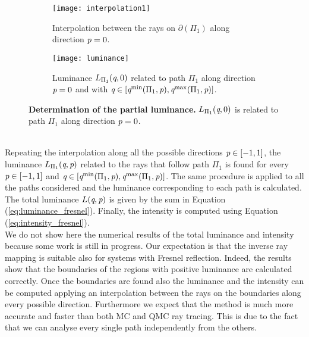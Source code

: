 \begin{figure}[t]
\centering
\begin{subfigure}{.45\textwidth}
  \texttt{[image: interpolation1]}
 \caption{Interpolation between the rays on $\partial$$(\Pi_1)$ along direction $\textit{p}=0$.}
  \label{fig:interpolation1}
\end{subfigure}%
\hfill
\begin{subfigure}{.45\textwidth}
  \texttt{[image: luminance]}
  \caption{Luminance $L_{\Pi_1}(\textit{q}, 0)$ related to path $\Pi_1$ along direction $\textit{p}=0$ and with $\textit{q}\in[\textit{q}^{\textrm{min}}(\Pi_1, \textit{p}), \textit{q}^{\textrm{max}}(\Pi_1, \textit{p})]$.} %
  \label{fig:luminance_fresnel}
\end{subfigure} %
\caption{\textbf{Determination of the partial luminance.} $L_{\Pi_1}(\textit{q}, 0)$ is related to path $\Pi_1$ along direction $\textit{p}=0$.} 
\end{figure}
\\\indent 
Repeating the interpolation along all the possible directions $\textit{p}\in[-1,1]$, the luminance $L_{\Pi_1}(\textit{q}, \textit{p})$ related to the rays that follow path $\Pi_1$ is found for every $\textit{p}\in[-1,1]$ and $\textit{q}\in[\textit{q}^{\textrm{min}}(\Pi_1,\textit{p}), \textit{q}^{\textrm{max}}(\Pi_1,\textit{p})]$. The same procedure is applied to all the paths considered and the luminance corresponding to each path is calculated. The total luminance $L(\textit{q}, \textit{p})$ is given by the sum in Equation (\ref{eq:luminance_fresnel}). Finally, the intensity is computed using Equation (\ref{eq:intensity_fresnel}). \\ \indent
We do not show here the numerical results of the total luminance and intensity because some work is still in progress. Our expectation is that the inverse ray mapping is suitable also for systems with Fresnel reflection. Indeed, the results show that the boundaries of the regions with positive luminance are calculated correctly. Once the boundaries are found also the luminance and the intensity can be computed applying an interpolation between the rays on the boundaries along every possible direction. Furthermore we expect that the method is much more accurate and faster than both MC and QMC ray tracing. This is due to the fact that we can analyse every single path independently from the others.  

